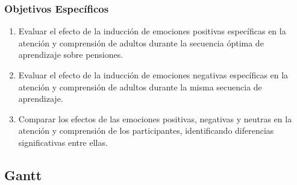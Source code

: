 \documentclass{article}
\begin{document}
\subsubsection{Objetivos Específicos}
\begin{enumerate}
    \item Evaluar el efecto de la inducción de emociones positivas específicas en la atención y comprensión de adultos durante la secuencia óptima de aprendizaje sobre pensiones.
    \item Evaluar el efecto de la inducción de emociones negativas específicas en la atención y comprensión de adultos durante la misma secuencia de aprendizaje.
    \item Comparar los efectos de las emociones positivas, negativas y neutras en la atención y comprensión de los participantes, identificando diferencias significativas entre ellas.
\end{enumerate}

\subsection{Gantt}
\end{document}
